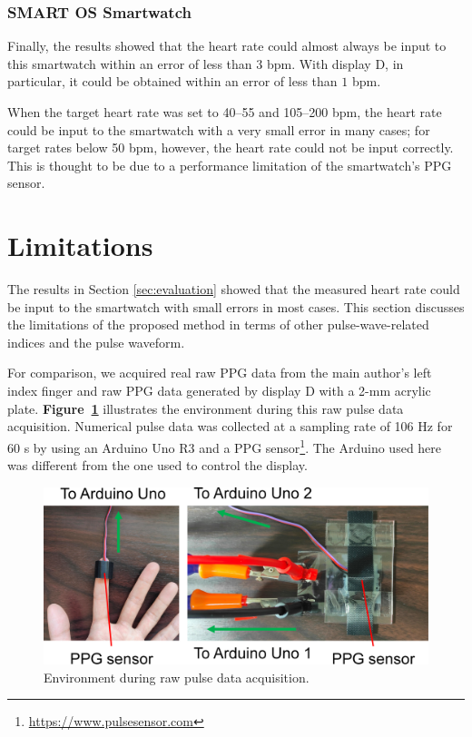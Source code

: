\documentclass[manuscript,screen,review]{acmart}
\newcommand\figref[1]{\textbf{Figure~\ref{fig:#1}}}
\begin{document}
\subsubsection{SMART OS Smartwatch}
Finally, the results showed that the heart rate could almost always be input to this smartwatch within an error of less than $3$ bpm. With display D, in particular, it could be obtained within an error of less than $1$ bpm.\par

When the target heart rate was set to 40--55 and 105--200 bpm, the heart rate could be input to the smartwatch with a very small error in many cases; for target rates below 50 bpm, however, the heart rate could not be input correctly. This is thought to be due to a performance limitation of the smartwatch's PPG sensor.



\section{Limitations}
\label{sec:limitation}
The results in Section \ref{sec:evaluation} showed that the measured heart rate could be input to the smartwatch with small errors in most cases. This section discusses the limitations of the proposed method in terms of other pulse-wave-related indices and the pulse waveform.\par

For comparison, we acquired real raw PPG data from the main author's left index finger and raw PPG data generated by display D with a 2-mm acrylic plate. \figref{raw_data_acquisition} illustrates the environment during this raw pulse data acquisition. Numerical pulse data was collected at a sampling rate of 106 Hz for 60 s by using an Arduino Uno R3 and a PPG sensor\footnote{\url{https://www.pulsesensor.com}}. The Arduino used here was different from the one used to control the display.

\begin{figure}[!t]
  \centering
  \includegraphics[width=1\linewidth]{figures/raw_data_acquisition.eps}
  \caption{Environment during raw pulse data acquisition.}
  \label{fig:raw_data_acquisition}
\end{figure}
\end{document}
